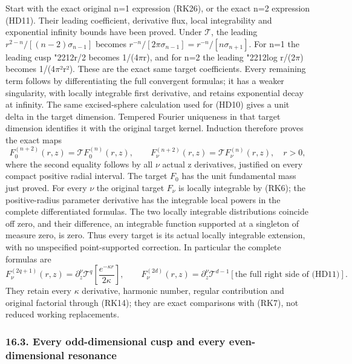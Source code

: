 \documentclass[
  11pt,
]{article}
\begin{document}
Start with the exact original n=1 expression (RK26), or the exact n=2
expression (HD11). Their leading coefficient, derivative flux, local
integrability and exponential infinity bounds have been proved. Under
\(\mathcal T\), the leading \(r^{2-n}/[(n-2)\sigma_{n-1}]\) becomes
\(r^{-n}/[2\pi\sigma_{n-1}]=r^{-n}/[n\sigma_{n+1}]\). For n=1 the
leading cusp {\ReaderSymbols\char"2212}r/2 becomes 1/(4\ensuremath{\pi}r), and for n=2 the leading {\ReaderSymbols\char"2212}log r/(2\ensuremath{\pi})
becomes 1/(4\ensuremath{\pi}²r²). These are the exact same target coefficients. Every
remaining term follows by differentiating the full convergent formulas;
it has a weaker singularity, with locally integrable first derivative,
and retains exponential decay at infinity. The same excised-sphere
calculation used for (HD10) gives a unit delta in the target dimension.
Tempered Fourier uniqueness in that target dimension identifies it with
the original target kernel. Induction therefore proves the exact maps \[
F_0^{(n+2)}(r,z)=\mathcal T F_0^{(n)}(r,z),\qquad
F_\nu^{(n+2)}(r,z)=\mathcal T F_\nu^{(n)}(r,z),\quad r>0,
\tag{HD13}
\] where the second equality follows by all \ensuremath{\nu} actual z derivatives,
justified on every compact positive radial interval. The target \(F_0\)
has the unit fundamental mass just proved. For every \ensuremath{\nu} the original
target \(F_\nu\) is locally integrable by (RK6); the positive-radius
parameter derivative has the integrable local powers in the complete
differentiated formulas. The two locally integrable distributions
coincide off zero, and their difference, an integrable function
supported at a singleton of measure zero, is zero. Thus every target is
its actual locally integrable extension, with no unspecified
point-supported correction. In particular the complete formulas are \[
F_\nu^{(2q+1)}(r,z)=\partial_z^\nu\mathcal T^q
                     \left[\frac{e^{-\kappa r}}{2\kappa}\right],
\qquad
F_\nu^{(2d)}(r,z)=\partial_z^\nu\mathcal T^{d-1}
                     [\text{the full right side of (HD11)}].
\tag{HD14}
\] They retain every \ensuremath{\kappa} derivative, harmonic number, regular contribution
and original factorial through (RK14); they are exact comparisons with
(RK7), not reduced working replacements.

\subsubsection{16.3. Every odd-dimensional cusp and every
even-dimensional
resonance}\label{every-odd-dimensional-cusp-and-every-even-dimensional-resonance}
\end{document}
